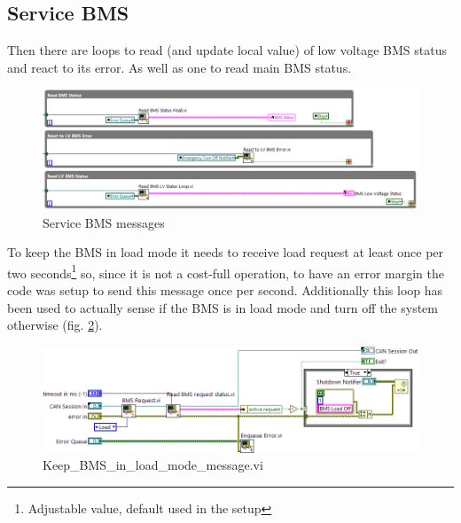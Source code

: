 \subsection{Service BMS}
Then there are loops to read (and update local value) of low voltage BMS status and react to its error. As well as one to read main BMS status.
\begin{figure}[H]
    \centering
    \includegraphics[scale=\visc,max width=\textwidth]{figures/Read_BMSs.png}
    \caption{Service BMS messages}
    \label{BMSs_status}
\end{figure}
To keep the BMS in load mode it needs to receive load request at least once per two seconds\footnote{Adjustable value, default used in the setup} so, since it is not a cost-full operation, to have an error margin the code was setup to send this message once per second.
Additionally this loop has been used to actually sense if the BMS is in load mode and turn off the system otherwise (fig. \ref{vi:Keep_BMS_in_load_mode_message}).
\begin{figure}[H]
    \centering
    \includegraphics[scale=\visc,max width=\textwidth]{figures/Keep_BMS_in_load_mode_messaged}
    \caption{Keep\_BMS\_in\_load\_mode\_message.vi}
    \label{vi:Keep_BMS_in_load_mode_message}
\end{figure}

